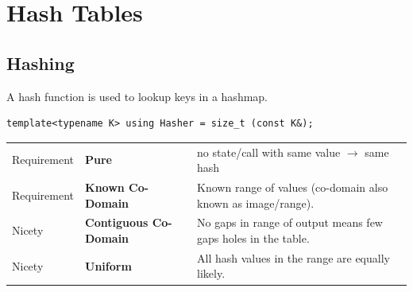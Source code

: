 \section{Hash Tables}
\subsection{Hashing}
A hash function is used to lookup keys in a hashmap.
\begin{verbatim}
template<typename K> using Hasher = size_t (const K&);
\end{verbatim}
\begin{center}
    \begin{tabular}{l l p{}}
        Requirement & \textbf{Pure}                 & no state/call with same value $\to$ same hash                 \\
        Requirement & \textbf{Known Co-Domain}      & Known range of values (co-domain also known as image/range).  \\
        Nicety      & \textbf{Contiguous Co-Domain} & No gaps in range of output means few gaps holes in the table. \\
        Nicety      & \textbf{Uniform}              & All hash values in the range are equally likely.              \\
    \end{tabular}
\end{center}

